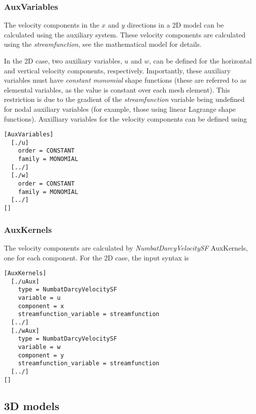 \documentclass[11pt, a4paper]{csiroreport2012}
\begin{document}
\subsubsection*{AuxVariables}

The velocity components in the $x$ and $y$ directions in a 2D model can be calculated using the auxiliary system. These velocity components are calculated using the \emph{streamfunction}, see the mathematical model for details.

In the 2D case, two auxiliary variables, $u$ and $w$, can be defined for the horizontal and vertical velocity components, respectively. Importantly, these auxiliary variables must have \emph{constant monomial} shape functions (these are referred to as elemental variables, as the value is constant over each mesh element). This restriction is due to the gradient of the \emph{streamfunction} variable being undefined for nodal auxiliary variables (for example, those using linear Lagrange shape functions). Auxilliary variables for the velocity components can be defined using
\begin{shaded}
\begin{verbatim}
[AuxVariables]
  [./u]
    order = CONSTANT
    family = MONOMIAL
  [../]
  [./w]
    order = CONSTANT
    family = MONOMIAL
  [../]
[]
\end{verbatim}
\end{shaded}

\subsubsection*{AuxKernels}

The velocity components are calculated by \emph{NumbatDarcyVelocitySF} AuxKernels, one for each component. For the 2D case, the input syntax is
\begin{shaded}
\begin{verbatim}
[AuxKernels]
  [./uAux]
    type = NumbatDarcyVelocitySF
    variable = u
    component = x
    streamfunction_variable = streamfunction
  [../]
  [./wAux]
    type = NumbatDarcyVelocitySF
    variable = w
    component = y
    streamfunction_variable = streamfunction
  [../]
[]
\end{verbatim}
\end{shaded}

\subsection{3D models}
\end{document}
